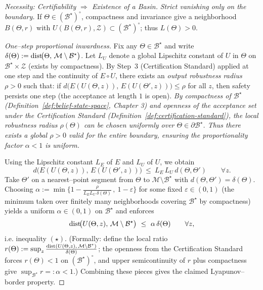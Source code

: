 \documentclass[12pt]{article}
\theoremstyle{definition}
\theoremstyle{plain}
\begin{document}
\begin{proof}[Necessity: Certifiability $\Rightarrow$ Existence of a Basin]
\emph{Strict vanishing only on the boundary.} If $\Theta\in(\mathcal B^\star)^\circ$, compactness and invariance give a neighborhood $B(\Theta,r)$ with $U(B(\Theta,r),\mathcal Z)\subset (\mathcal B^\star)^\circ$; thus $L(\Theta)>0$.

\emph{One–step proportional inwardness.} Fix any $\Theta\in\mathcal B^\star$ and write $\delta(\Theta):={\rm dist}\!\bigl(\Theta,\,\mathcal M\setminus\mathcal B^\star\bigr)$. Let $L_U$ denote a global Lipschitz constant of $U$ in $\Theta$ on $\mathcal B^\star\times\mathcal Z$ (exists by compactness). By Step~3 (Certification Standard) applied at one step and the continuity of $E\circ U$, there exists an \emph{output robustness radius} $\rho>0$ such that: if
$d\bigl(E(U(\Theta,z)),\,E(U(\Theta',z))\bigr)\le \rho$ for all $z$, then safety persists one step (the acceptance at length $1$ is open). \emph{By compactness of $\mathcal{B}^\star$ (Definition~\ref{def:belief-state-space}, Chapter 3) and openness of the acceptance set under the Certification Standard (Definition~\ref{def:certification-standard}), the local robustness radius $\rho(\Theta)$ can be chosen uniformly over $\Theta\in\partial\mathcal{B}^\star$.  Thus there exists a global $\rho>0$ valid for the entire boundary, ensuring the proportionality factor $\alpha<1$ is uniform.}


Using the Lipschitz constant $L_E$ of $E$ and $L_U$ of $U$, we obtain
\[
d\bigl(E(U(\Theta,z)),\,E(U(\Theta',z))\bigr)\ \le\ L_E\,L_U\,d(\Theta,\Theta')\qquad\forall z.
\]
Take $\Theta'$ on a nearest–point segment from $\Theta$ to $\mathcal M\setminus\mathcal B^\star$ with $d(\Theta,\Theta')=\delta(\Theta)$.
Choosing $\alpha:=\min\{1-\tfrac{\rho}{L_E L_U\,\delta(\Theta)}\, ,\ 1-\varepsilon\}$ for some fixed $\varepsilon\in(0,1)$ (the minimum taken over finitely many neighborhoods covering $\mathcal B^\star$ by compactness) yields a uniform $\alpha\in(0,1)$ on $\mathcal B^\star$ and enforces
\[
{\rm dist}\!\bigl(U(\Theta,z),\,\mathcal M\setminus\mathcal B^\star\bigr)
\ \le\ \alpha\,\delta(\Theta)\qquad\forall z,
\]
i.e. inequality $(\star)$. (Formally: define the local ratio $r(\Theta):=\sup_z \tfrac{{\rm dist}(U(\Theta,z),\,\mathcal M\setminus\mathcal B^\star)}{\delta(\Theta)}$; the openness from the Certification Standard forces $r(\Theta)<1$ on $(\mathcal B^\star)^\circ$, and upper semicontinuity of $r$ plus compactness give $\sup_{\mathcal B^\star} r=: \alpha<1$.) Combining these pieces gives the claimed Lyapunov–border property.
\qedhere



\end{proof}
\end{document}
